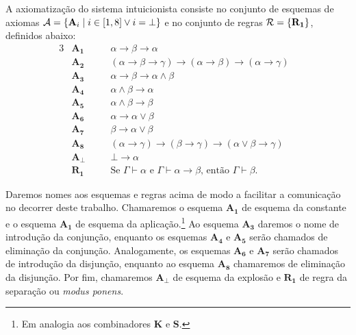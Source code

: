     \begin{definition}
        A axiomatização do sistema intuicionista consiste no conjunto de esquemas de axiomas $\mathcal{A}=\left\{\mathbf{A}_i\mid i\in[1,8]\vee i=\bot\right\}$ e no conjunto de regras $\mathcal{R}=\left\{\mathbf{R_1}\right\}$, definidos abaixo:
        \begin{alignat*}{3}
            &\mathbf{A_1}\quad&&\alpha\to\beta\to\alpha\label{IA1}\tag*{}\\
            &\mathbf{A_2}\quad&&(\alpha\to\beta\to\gamma)\to(\alpha\to\beta)\to(\alpha\to\gamma)\label{IA2}\tag*{}\\
            &\mathbf{A_3}\quad&&\alpha\to\beta\to\alpha\wedge\beta\label{IA3}\tag*{}\\
            &\mathbf{A_4}\quad&&\alpha\wedge\beta\to\alpha\label{IA4}\tag*{}\\
            &\mathbf{A_5}\quad&&\alpha\wedge\beta\to\beta\label{IA5}\tag*{}\\
            &\mathbf{A_6}\quad&&\alpha\to\alpha\vee\beta\label{IA6}\tag*{}\\
            &\mathbf{A_7}\quad&&\beta\to\alpha\vee\beta\label{IA7}\tag*{}\\
            &\mathbf{A_8}\quad&&(\alpha\to\gamma)\to(\beta\to\gamma)\to(\alpha\vee\beta\to\gamma)\label{IA8}\tag*{}\\
            &\mathbf{A_\bot}\quad&&\bot\to\alpha\label{IABOT}\tag*{}\\
            & \mathbf{R_1}\quad && \text{Se }\Gamma\vdash\alpha\text{ e }\Gamma\vdash\alpha\to\beta\text{, então }\Gamma\vdash\beta\text{.} & \tag*{\qed}
        \end{alignat*}   
    \end{definition}

    Daremos nomes aos esquemas e regras acima de modo a facilitar a comunicação no decorrer deste trabalho. Chamaremos o esquema $\mathbf{A_1}$ de esquema da constante e o esquema $\mathbf{A_1}$ de esquema da aplicação.\footnote{Em analogia aos combinadores $\mathbf{K}$ e $\mathbf{S}$.} Ao esquema $\mathbf{A_3}$ daremos o nome de introdução da conjunção, enquanto os esquemas $\mathbf{A_4}$ e $\mathbf{A_5}$ serão chamados de eliminação da conjunção. Analogamente, os esquemas $\mathbf{A_6}$ e $\mathbf{A_7}$ serão chamados de introdução da disjunção, enquanto ao esquema $\mathbf{A_8}$ chamaremos de eliminação da disjunção.
    Por fim, chamaremos $\mathbf{A_\bot}$ de esquema da explosão e $\mathbf{R_1}$ de regra da separação ou \emph{modus ponens}.
